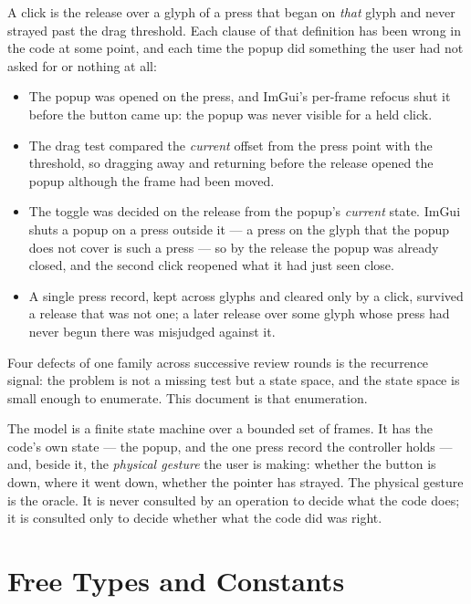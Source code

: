 \documentclass[a4paper,10pt,fleqn]{article}
\begin{document}
A click is the release over a glyph of a press that began on \emph{that}
glyph and never strayed past the drag threshold.  Each clause of that
definition has been wrong in the code at some point, and each time the popup
did something the user had not asked for or nothing at all:
\begin{itemize}
  \item The popup was opened on the press, and ImGui's per-frame refocus shut
    it before the button came up: the popup was never visible for a held
    click.
  \item The drag test compared the \emph{current} offset from the press point
    with the threshold, so dragging away and returning before the release
    opened the popup although the frame had been moved.
  \item The toggle was decided on the release from the popup's \emph{current}
    state.  ImGui shuts a popup on a press outside it --- a press on the glyph
    that the popup does not cover is such a press --- so by the release the
    popup was already closed, and the second click reopened what it had just
    seen close.
  \item A single press record, kept across glyphs and cleared only by a
    click, survived a release that was not one; a later release over some
    glyph whose press had never begun there was misjudged against it.
\end{itemize}
Four defects of one family across successive review rounds is the recurrence
signal: the problem is not a missing test but a state space, and the state space
is small enough to enumerate.  This document is that enumeration.

The model is a finite state machine over a bounded set of frames.  It has the
code's own state --- the popup, and the one press record the controller holds
--- and, beside it, the \emph{physical gesture} the user is making: whether the
button is down, where it went down, whether the pointer has strayed.  The
physical gesture is the oracle.  It is never consulted by an operation to
decide what the code does; it is consulted only to decide whether what the code
did was right.

\section{Free Types and Constants}
\end{document}
